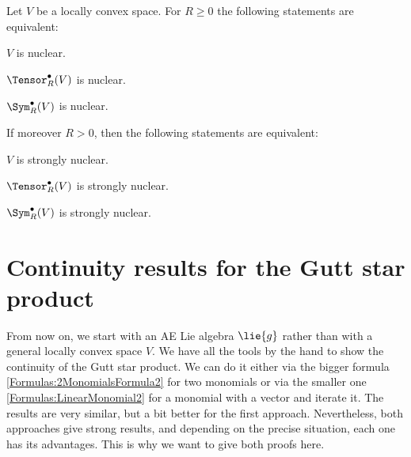 \begin{proposition}
	\label{LCAna:Nuclearity}
	Let $V$ be a locally convex space. For $R \geq 0$ the following statements 
	are equivalent:
	\begin{propositionlist}
	  \item
		$V$ is nuclear.
	  \item
	  	$\Tensor_R^{\bullet}(V)$ is nuclear.
	  \item
	  	$\Sym_R^{\bullet}(V)$ is nuclear.	  	
	\end{propositionlist}
	If moreover $R > 0$, then the following statements are equivalent:
	\begin{propositionlist}
	  \item
		$V$ is strongly nuclear.
	  \item
	  	$\Tensor_R^{\bullet}(V)$ is strongly nuclear.
	  \item
	  	$\Sym_R^{\bullet}(V)$ is strongly nuclear.
	\end{propositionlist}
\end{proposition}




\section{Continuity results for the Gutt star product}
\label{sec:chap5_TopologyStar}

From now on, we start with an AE Lie algebra $\lie{g}$ rather than with a 
general locally convex space $V$. We have all the tools by the hand to show the 
continuity of the Gutt star product. We can do it either via the bigger 
formula \eqref{Formulas:2MonomialsFormula2} for two monomials or via the 
smaller one \eqref{Formulas:LinearMonomial2} for a monomial with a 
vector and iterate it. The results are very similar, but a bit better for the 
first approach. Nevertheless, both approaches give strong results, and 
depending on the precise situation, each one has its advantages. This is why 
we want to give both proofs here.

